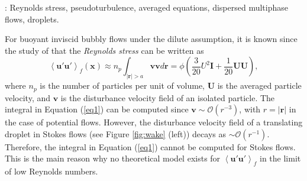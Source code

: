 \documentclass[12pt,a4paper]{article}
\newcommand{\avg}[1]{\left<#1\right>}
\renewcommand{\avg}[1]{\left<#1\right>}
\begin{document}
: Reynolds stress, pseudoturbulence, averaged equations, dispersed multiphase flows, droplets. 

\vspace{10pt}


For buoyant inviscid bubbly flows under the dilute assumption, it is known since the study of \cite{van1982bubble} that the \textit{Reynolds stress} can be written as
\begin{equation}
    \avg{\textbf{u}'\textbf{u}'}_f (\textbf{x})
    \approx
    n_p \int_{|\textbf{r}| > a}\textbf{v}\textbf{v}  d\textbf{r}
    = \phi \left(\frac{3}{20} U^2\textbf{I} + \frac{1}{20} \textbf{UU} \right),
    \label{eq1}
\end{equation}
where $n_p$ is the number of particles per unit of volume, $\textbf{U}$ is the averaged particle velocity, and $\textbf{v}$ is the disturbance velocity field of an isolated particle. 
The integral in Equation (\ref{eq1}) can be computed since $\textbf{v} \sim \mathcal{O}(r^{-3})$, with $r =|\textbf{r}|$ in the case of potential flows. 
However, the disturbance velocity field of a translating droplet in Stokes flows (see Figure \ref{fig:wake} (left)) decays as $\sim \mathcal{O}(r^{-1})$. 
Therefore, the integral in Equation (\ref{eq1}) cannot be computed for Stokes flows. 
This is the main reason why no theoretical model exists for $\avg{\textbf{u}'\textbf{u}'}_f$ in the limit of low Reynolds numbers. 

 
\end{document}
